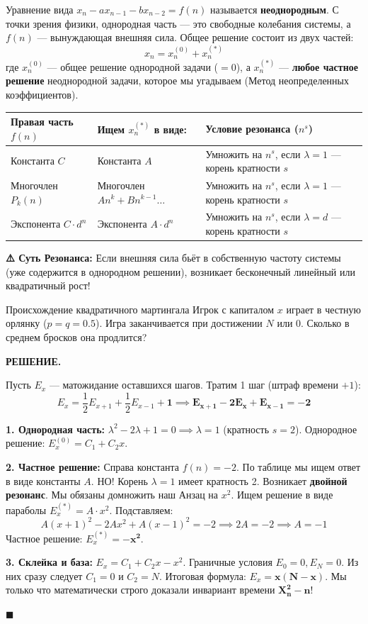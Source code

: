 \documentclass[12pt,a4paper]{article}
\newenvironment{solution}{
    \begin{tcolorbox}[
        enhanced, breakable, blanker,
        borderline west={2.5pt}{0pt}{solgray},
        left=12pt, top=5pt, bottom=5pt,
        before skip=10pt, after skip=15pt
    ]
    \textbf{\textsf{РЕШЕНИЕ.}}\;
}{
    \hfill $\blacksquare$
    \end{tcolorbox}
}
\begin{document}
Уравнение вида $x_n - a x_{n-1} - b x_{n-2} = f(n)$ называется \textbf{неоднородным}. 
С точки зрения физики, однородная часть — это свободные колебания системы, а $f(n)$ — вынуждающая внешняя сила. Общее решение состоит из двух частей:
\[ x_n = x_n^{(0)} + x_n^{(*)} \]
где $x_n^{(0)}$ --- общее решение однородной задачи ($= 0$), а $x_n^{(*)}$ --- \textbf{любое частное решение} неоднородной задачи, которое мы угадываем (Метод неопределенных коэффициентов).

\begin{tcolorbox}[colback=white, colframe=defblue!80!black, title=\textbf{Таблица Угадываний (Анзац для $x_n^{(*)}$)}, fonttitle=\bfseries]
\renewcommand{\arraystretch}{1.5}
\begin{tabular}{|p{4.5cm}|p{5.5cm}|p{5cm}|}
\hline
\textbf{Правая часть $f(n)$} & \textbf{Ищем $x_n^{(*)}$ в виде:} & \textbf{Условие резонанса ($n^s$)} \\
\hline
Константа $C$ & Константа $A$ & Умножить на $n^s$, если $\lambda=1$ — корень кратности $s$ \\
\hline
Многочлен $P_k(n)$ & Многочлен $A n^k + B n^{k-1} \dots$ & Умножить на $n^s$, если $\lambda=1$ — корень кратности $s$ \\
\hline
Экспонента $C \cdot d^n$ & Экспонента $A \cdot d^n$ & Умножить на $n^s$, если $\lambda=d$ — корень кратности $s$ \\
\hline
\end{tabular}
\end{tcolorbox}
\textbf{⚠️ Суть Резонанса:} Если внешняя сила бьёт в собственную частоту системы (уже содержится в однородном решении), возникает бесконечный линейный или квадратичный рост!

\begin{problem}{Происхождение квадратичного мартингала}{}
Игрок с капиталом $x$ играет в честную орлянку ($p=q=0.5$). Игра заканчивается при достижении $N$ или $0$. Сколько в среднем бросков она продлится?
\end{problem}
\begin{solution}
Пусть $E_x$ — матожидание оставшихся шагов. Тратим 1 шаг (штраф времени $+1$):
\[ E_x = \frac{1}{2} E_{x+1} + \frac{1}{2} E_{x-1} + \mathbf{1} \implies \mathbf{E_{x+1} - 2E_x + E_{x-1} = -2} \]

\textbf{1. Однородная часть:} $\lambda^2 - 2\lambda + 1 = 0 \implies \lambda = 1$ (кратность $s=2$). 
Однородное решение: $E_x^{(0)} = C_1 + C_2 x$.

\textbf{2. Частное решение:} Справа константа $f(n) = -2$. По таблице мы ищем ответ в виде константы $A$. НО! Корень $\lambda=1$ имеет кратность 2. Возникает \textbf{двойной резонанс}. Мы обязаны домножить наш Анзац на $x^2$. 
Ищем решение в виде параболы $E_x^{(*)} = A \cdot x^2$. Подставляем:
\[ A(x+1)^2 - 2Ax^2 + A(x-1)^2 = -2 \implies 2A = -2 \implies A = -1 \]
Частное решение: $E_x^{(*)} = \mathbf{-x^2}$.

\textbf{3. Склейка и база:} $E_x = C_1 + C_2 x - x^2$. Граничные условия $E_0 = 0, E_N = 0$.
Из них сразу следует $C_1 = 0$ и $C_2 = N$. Итоговая формула: $E_x = \mathbf{x(N - x)}$. 
Мы только что математически строго доказали инвариант времени $\mathbf{X_n^2 - n}$! 
\end{solution}
\end{document}
